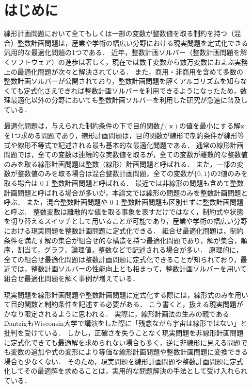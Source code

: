 \documentclass[japanese]{jnlp_1.4}
\begin{document}
\maketitle


\section{はじめに\label{sec:introduction}}
線形計画問題において全てもしくは一部の変数が整数値を取る制約を持つ（混合）整数計画問題は，産業や学術の幅広い分野における現実問題を定式化できる汎用的な最適化問題の1つである．
近年，整数計画ソルバー（整数計画問題を解くソフトウェア）の進歩は著しく，現在では数千変数から数万変数におよぶ実務上の最適化問題が次々と解決されている．
また，商用・非商用を含めて多数の整数計画ソルバーが公開されており，整数計画問題を解くアルゴリズムを知らなくても定式化さえできれば整数計画ソルバーを利用できるようになったため，数理最適化以外の分野においても整数計画ソルバーを利用した研究が急速に普及している．

最適化問題は，与えられた制約条件の下で目的関数$f(\bm{x})$の値を最小にする解$\bm{x}$を1つ求める問題であり，線形計画問題は，目的関数が線形で制約条件が線形等式や線形不等式で記述される最も基本的な最適化問題である．
通常の線形計画問題では，全ての変数は連続的な実数値を取るが，全ての変数が離散的な整数値のみを取る線形計画問題は整数（線形）計画問題と呼ばれる．
また，一部の変数が整数値のみを取る場合は混合整数計画問題，全ての変数が$\{0,1\}$の2値のみを取る場合は 0-1 整数計画問題と呼ばれる．
最近では非線形の問題も含めて整数計画問題と呼ばれる場合が多いが，本論文では線形の問題のみを整数計画問題と呼ぶ．
また，混合整数計画問題や 0-1 整数計画問題も区別せずに整数計画問題と呼ぶ．
整数変数は離散的な値を取る事象を表すだけではなく，制約式や状態を切り替えるスイッチとして用いることが可能であり，産業や学術の幅広い分野における現実問題を整数計画問題に定式化できる．
組合せ最適化問題は，制約条件を満たす解の集合が組合せ的な構造を持つ最適化問題であり，解が集合，順序，割当て，グラフ，論理値，整数などで記述される場合が多い．
原理的に，全ての組合せ最適化問題は整数計画問題に定式化できることが知られており，最近では，整数計画ソルバーの性能向上とも相まって，整数計画ソルバーを用いて組合せ最適化問題を解く事例が増えている．

現実問題を線形計画問題や整数計画問題に定式化する際には，線形式のみを用いて目的関数と制約条件を記述する必要がある．
こう書くと，扱える現実問題がかなり限定されるように思われる．
実際に，線形計画法の生みの親であるDantzigもWisconsin大学で講演をした際に「残念ながら宇宙は線形ではない」と批判を受けている\cite{KonnoH2005}．
しかし，正確さを失うことなく現実問題を非線形計画問題に定式化できても最適解を求められない場合も多く，逆に非線形に見える問題でも変数の追加や式の変形により等価な線形計画問題や整数計画問題に変換できる場合も少なくない．
そのため，現実問題を線形計画問題や整数計画問題に定式化してその最適解を求めることは，実用的な問題解決の手法として受け入れられている．
\end{document}
